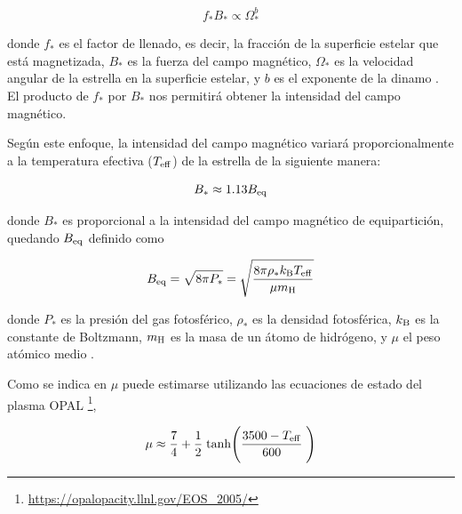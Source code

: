 \begin{ceqn}
	\begin{equation}
		f_*B_* \propto \Omega_*^b \label{eq:mf_strenght}
	\end{equation}
\end{ceqn}

donde $f_*$ es el factor de llenado, es decir, la fracción de la superficie estelar que está magnetizada, $B_*$ es la fuerza del campo magnético, $\Omega_*$ es la velocidad angular de la estrella en la superficie estelar, y $b$ es el exponente de la dinamo \cite{Gallet2013}. El producto de $f_*$ por $B_*$ nos permitirá obtener la intensidad del campo magnético. \par

Según este enfoque, la intensidad del campo magnético variará proporcionalmente a la temperatura efectiva ($T_{\mathrm{eff}}$) de la estrella de la siguiente manera: 
\begin{ceqn}
	\begin{equation}
		B_* \approx 1.13 B_{\mathrm{eq}} \label{eq:mf_bstar}
	\end{equation}
\end{ceqn}

donde $B_*$ es proporcional a la intensidad del campo magnético de equipartición, quedando $B_{\mathrm{eq}}$ definido como 

\begin{ceqn}
	\begin{equation}
		B_{\mathrm{eq}} = \sqrt{8\pi P_*} = \sqrt{\frac{8\pi\rho_* k_{\mathrm{B}} T_{\mathrm{eff}}}{\mu m_{\mathrm{H}}}}\label{eq:mf_beq}    
	\end{equation}
\end{ceqn}

donde $P_*$ es la presión del gas fotosférico, $\rho_*$ es la densidad fotosférica, $k_{\mathrm{B}}$ es la constante de Boltzmann, $m_{\mathrm{H}}$ es la masa de un átomo de hidrógeno, y $\mu$ el peso atómico medio \cite{Cranmer2011}. \par

Como se indica en \cite{Cranmer2011} $\mu$ puede estimarse utilizando las ecuaciones de estado del plasma OPAL \footnote{\url{https://opalopacity.llnl.gov/EOS_2005/}},

\begin{ceqn}
	\begin{equation}
		\mu \approx \frac{7}{4} + \frac{1}{2} \; \textrm{tanh}\Bigg(\frac{3500-T_{\mathrm{eff}}}{600}\;\Bigg) \label{eq:mf_atom_weight}
	\end{equation}
\end{ceqn}

